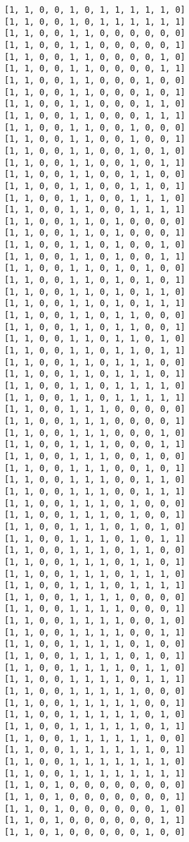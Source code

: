 \documentclass[11pt]{article}
\begin{document}
\begin{Verbatim}[commandchars=\\\{\}]
[1, 1, 0, 0, 1, 0, 1, 1, 1, 1, 1, 0]
[1, 1, 0, 0, 1, 0, 1, 1, 1, 1, 1, 1]
[1, 1, 0, 0, 1, 1, 0, 0, 0, 0, 0, 0]
[1, 1, 0, 0, 1, 1, 0, 0, 0, 0, 0, 1]
[1, 1, 0, 0, 1, 1, 0, 0, 0, 0, 1, 0]
[1, 1, 0, 0, 1, 1, 0, 0, 0, 0, 1, 1]
[1, 1, 0, 0, 1, 1, 0, 0, 0, 1, 0, 0]
[1, 1, 0, 0, 1, 1, 0, 0, 0, 1, 0, 1]
[1, 1, 0, 0, 1, 1, 0, 0, 0, 1, 1, 0]
[1, 1, 0, 0, 1, 1, 0, 0, 0, 1, 1, 1]
[1, 1, 0, 0, 1, 1, 0, 0, 1, 0, 0, 0]
[1, 1, 0, 0, 1, 1, 0, 0, 1, 0, 0, 1]
[1, 1, 0, 0, 1, 1, 0, 0, 1, 0, 1, 0]
[1, 1, 0, 0, 1, 1, 0, 0, 1, 0, 1, 1]
[1, 1, 0, 0, 1, 1, 0, 0, 1, 1, 0, 0]
[1, 1, 0, 0, 1, 1, 0, 0, 1, 1, 0, 1]
[1, 1, 0, 0, 1, 1, 0, 0, 1, 1, 1, 0]
[1, 1, 0, 0, 1, 1, 0, 0, 1, 1, 1, 1]
[1, 1, 0, 0, 1, 1, 0, 1, 0, 0, 0, 0]
[1, 1, 0, 0, 1, 1, 0, 1, 0, 0, 0, 1]
[1, 1, 0, 0, 1, 1, 0, 1, 0, 0, 1, 0]
[1, 1, 0, 0, 1, 1, 0, 1, 0, 0, 1, 1]
[1, 1, 0, 0, 1, 1, 0, 1, 0, 1, 0, 0]
[1, 1, 0, 0, 1, 1, 0, 1, 0, 1, 0, 1]
[1, 1, 0, 0, 1, 1, 0, 1, 0, 1, 1, 0]
[1, 1, 0, 0, 1, 1, 0, 1, 0, 1, 1, 1]
[1, 1, 0, 0, 1, 1, 0, 1, 1, 0, 0, 0]
[1, 1, 0, 0, 1, 1, 0, 1, 1, 0, 0, 1]
[1, 1, 0, 0, 1, 1, 0, 1, 1, 0, 1, 0]
[1, 1, 0, 0, 1, 1, 0, 1, 1, 0, 1, 1]
[1, 1, 0, 0, 1, 1, 0, 1, 1, 1, 0, 0]
[1, 1, 0, 0, 1, 1, 0, 1, 1, 1, 0, 1]
[1, 1, 0, 0, 1, 1, 0, 1, 1, 1, 1, 0]
[1, 1, 0, 0, 1, 1, 0, 1, 1, 1, 1, 1]
[1, 1, 0, 0, 1, 1, 1, 0, 0, 0, 0, 0]
[1, 1, 0, 0, 1, 1, 1, 0, 0, 0, 0, 1]
[1, 1, 0, 0, 1, 1, 1, 0, 0, 0, 1, 0]
[1, 1, 0, 0, 1, 1, 1, 0, 0, 0, 1, 1]
[1, 1, 0, 0, 1, 1, 1, 0, 0, 1, 0, 0]
[1, 1, 0, 0, 1, 1, 1, 0, 0, 1, 0, 1]
[1, 1, 0, 0, 1, 1, 1, 0, 0, 1, 1, 0]
[1, 1, 0, 0, 1, 1, 1, 0, 0, 1, 1, 1]
[1, 1, 0, 0, 1, 1, 1, 0, 1, 0, 0, 0]
[1, 1, 0, 0, 1, 1, 1, 0, 1, 0, 0, 1]
[1, 1, 0, 0, 1, 1, 1, 0, 1, 0, 1, 0]
[1, 1, 0, 0, 1, 1, 1, 0, 1, 0, 1, 1]
[1, 1, 0, 0, 1, 1, 1, 0, 1, 1, 0, 0]
[1, 1, 0, 0, 1, 1, 1, 0, 1, 1, 0, 1]
[1, 1, 0, 0, 1, 1, 1, 0, 1, 1, 1, 0]
[1, 1, 0, 0, 1, 1, 1, 0, 1, 1, 1, 1]
[1, 1, 0, 0, 1, 1, 1, 1, 0, 0, 0, 0]
[1, 1, 0, 0, 1, 1, 1, 1, 0, 0, 0, 1]
[1, 1, 0, 0, 1, 1, 1, 1, 0, 0, 1, 0]
[1, 1, 0, 0, 1, 1, 1, 1, 0, 0, 1, 1]
[1, 1, 0, 0, 1, 1, 1, 1, 0, 1, 0, 0]
[1, 1, 0, 0, 1, 1, 1, 1, 0, 1, 0, 1]
[1, 1, 0, 0, 1, 1, 1, 1, 0, 1, 1, 0]
[1, 1, 0, 0, 1, 1, 1, 1, 0, 1, 1, 1]
[1, 1, 0, 0, 1, 1, 1, 1, 1, 0, 0, 0]
[1, 1, 0, 0, 1, 1, 1, 1, 1, 0, 0, 1]
[1, 1, 0, 0, 1, 1, 1, 1, 1, 0, 1, 0]
[1, 1, 0, 0, 1, 1, 1, 1, 1, 0, 1, 1]
[1, 1, 0, 0, 1, 1, 1, 1, 1, 1, 0, 0]
[1, 1, 0, 0, 1, 1, 1, 1, 1, 1, 0, 1]
[1, 1, 0, 0, 1, 1, 1, 1, 1, 1, 1, 0]
[1, 1, 0, 0, 1, 1, 1, 1, 1, 1, 1, 1]
[1, 1, 0, 1, 0, 0, 0, 0, 0, 0, 0, 0]
[1, 1, 0, 1, 0, 0, 0, 0, 0, 0, 0, 1]
[1, 1, 0, 1, 0, 0, 0, 0, 0, 0, 1, 0]
[1, 1, 0, 1, 0, 0, 0, 0, 0, 0, 1, 1]
[1, 1, 0, 1, 0, 0, 0, 0, 0, 1, 0, 0]

\end{Verbatim}
\end{document}
